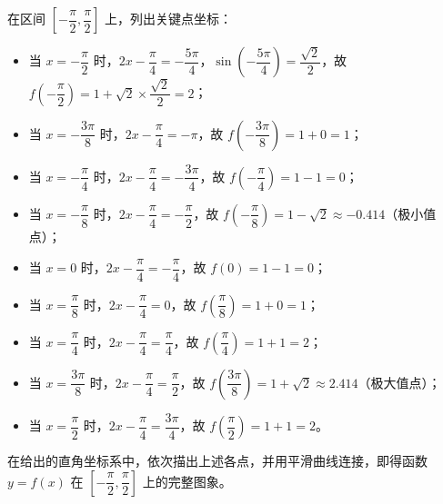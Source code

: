 \begin{answer}
\nopagebreak[4]
\begin{center}\end{center}
\nopagebreak[4]
在区间 $\left[-\dfrac{\pi}{2}, \dfrac{\pi}{2}\right]$ 上，列出关键点坐标：
\begin{itemize}
\item 当 $x = -\dfrac{\pi}{2}$ 时，$2x - \dfrac{\pi}{4} = -\dfrac{5\pi}{4}$，$\sin\left(-\dfrac{5\pi}{4}\right) = \dfrac{\sqrt{2}}{2}$，故 $f\left(-\dfrac{\pi}{2}\right) = 1 + \sqrt{2} \times \dfrac{\sqrt{2}}{2} = 2$；
\item 当 $x = -\dfrac{3\pi}{8}$ 时，$2x - \dfrac{\pi}{4} = -\pi$，故 $f\left(-\dfrac{3\pi}{8}\right) = 1 + 0 = 1$；
\item 当 $x = -\dfrac{\pi}{4}$ 时，$2x - \dfrac{\pi}{4} = -\dfrac{3\pi}{4}$，故 $f\left(-\dfrac{\pi}{4}\right) = 1 - 1 = 0$；
\item 当 $x = -\dfrac{\pi}{8}$ 时，$2x - \dfrac{\pi}{4} = -\dfrac{\pi}{2}$，故 $f\left(-\dfrac{\pi}{8}\right) = 1 - \sqrt{2} \approx -0.414$（极小值点）；
\item 当 $x = 0$ 时，$2x - \dfrac{\pi}{4} = -\dfrac{\pi}{4}$，故 $f(0) = 1 - 1 = 0$；
\item 当 $x = \dfrac{\pi}{8}$ 时，$2x - \dfrac{\pi}{4} = 0$，故 $f\left(\dfrac{\pi}{8}\right) = 1 + 0 = 1$；
\item 当 $x = \dfrac{\pi}{4}$ 时，$2x - \dfrac{\pi}{4} = \dfrac{\pi}{4}$，故 $f\left(\dfrac{\pi}{4}\right) = 1 + 1 = 2$；
\item 当 $x = \dfrac{3\pi}{8}$ 时，$2x - \dfrac{\pi}{4} = \dfrac{\pi}{2}$，故 $f\left(\dfrac{3\pi}{8}\right) = 1 + \sqrt{2} \approx 2.414$（极大值点）；
\item 当 $x = \dfrac{\pi}{2}$ 时，$2x - \dfrac{\pi}{4} = \dfrac{3\pi}{4}$，故 $f\left(\dfrac{\pi}{2}\right) = 1 + 1 = 2$。
\end{itemize}

在给出的直角坐标系中，依次描出上述各点，并用平滑曲线连接，即得函数 $y = f(x)$ 在 $\left[-\dfrac{\pi}{2}, \dfrac{\pi}{2}\right]$ 上的完整图象。



\end{answer}
